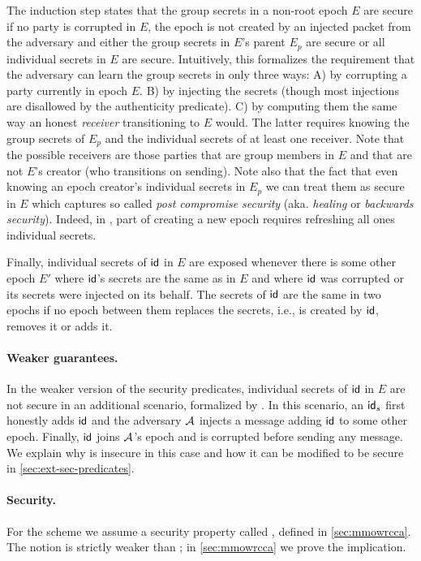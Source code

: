 The induction step states that the group secrets in a non-root epoch $E$
are secure if no party is corrupted in $E$, the epoch is not created
by an injected packet from the adversary and either the group secrets in
$E$'s parent $E_p$ are secure or all individual secrets in
$E$ are secure. Intuitively, this formalizes the requirement that the
adversary can learn the group secrets in only three ways: A) by corrupting a
party currently in epoch $E$. B) by injecting the secrets (though
most injections are disallowed by the authenticity predicate). C) by
computing them the same way an honest \emph{receiver} transitioning to
$E$ would. The latter requires knowing the group secrets of
$E_p$ and the individual secrets of at least one receiver. Note that
the possible receivers are those parties that are group members in
$E$ and that are not $E$'s creator (who transitions on
sending). Note also that the fact that even knowing an epoch creator's individual
secrets in $E_p$ we can treat them as secure in $E$ which captures
so called \emph{post compromise security} (aka. \emph{healing} or
\emph{backwards security}). Indeed, in \saik, part of creating a new epoch
requires refreshing all ones individual secrets.

Finally, individual secrets of ${\mathsf{id}}$ in $E$ are exposed whenever
there is some other epoch $E'$ where ${\mathsf{id}}$'s secrets are the same as
in $E$ and where ${\mathsf{id}}$ was corrupted or its secrets were injected on
its behalf. The secrets of ${\mathsf{id}}$ are the same in two epochs if no epoch between them replaces the secrets, i.e., is created by ${\mathsf{id}}$, removes
it or adds it.

\paragraph{Weaker guarantees.}
In the weaker version of the security predicates, individual secrets of ${\mathsf{id}}$
in $E$ are not secure in an additional scenario, formalized by
\safeWeakAdd. In this scenario, an ${\mathsf{id}}_s$ first honestly adds ${\mathsf{id}}$ and the
adversary $\mathcal{A}_{\relax}$ injects a message adding ${\mathsf{id}}$ to some other epoch. Finally,
${\mathsf{id}}$ joins $\mathcal{A}_{\relax}$'s epoch and is corrupted before sending any message. We explain why \saik is insecure in this case and how it can be modified to be secure in
\cref{sec:ext-sec-predicates}.

\paragraph{Security.} 
For the \mmPKE scheme we assume a security property called \mmowrcca, defined in \cref{sec:mmowrcca}. The notion is strictly weaker than \mmindcca; in \cref{sec:mmowrcca} we prove the implication.

